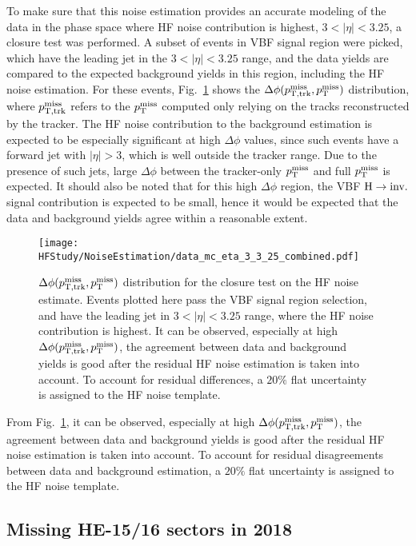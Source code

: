 To make sure that this noise estimation provides an accurate modeling of the data in the phase space where HF noise contribution is highest,
$3 < |\eta| < 3.25$, a closure test was performed. A subset of events in VBF signal region were picked, which have the leading jet in
the $3 < |\eta| < 3.25$ range, and the data yields are compared to the expected background yields in this region, including the HF noise estimation.
For these events, Fig.~\ref{fig:hf_noise_closure} shows the $\Delta\phi(p_{\mathrm{T, trk}}^{\mathrm{miss}}, p_{\textrm{T}}^{\textrm{miss}})$ distribution, where $p_{\mathrm{T, trk}}^{\mathrm{miss}}$ refers to the
$p_{\textrm{T}}^{\textrm{miss}}$ computed only relying on the tracks reconstructed by the tracker. The HF noise contribution to the background estimation is expected to be 
especially significant at high $\Delta\phi$ values,
since such events have a forward jet with $|\eta|>3$, which is well outside the tracker range. Due to the presence of such jets, 
large $\Delta\phi$ between the tracker-only $p_{\textrm{T}}^{\textrm{miss}}$
and full $p_{\textrm{T}}^{\textrm{miss}}$ is expected. It should also be noted that for this high $\Delta\phi$ region, the VBF $\textrm{H} \rightarrow \textrm{inv.}$ signal contribution is expected to be small,
hence it would be expected that the data and background yields agree within a reasonable extent.

\begin{figure}[h!]
    \centering
    \texttt{[image: HFStudy/NoiseEstimation/data\_mc\_eta\_3\_3\_25\_combined.pdf]}
    \caption{$\Delta\phi(p_{\mathrm{T, trk}}^{\mathrm{miss}}, p_{\textrm{T}}^{\textrm{miss}})$ distribution for the closure test on the HF noise estimate. Events plotted here pass the VBF signal 
    region selection, and have the leading jet in $3 < |\eta| < 3.25$ range, where the HF noise contribution is highest.
    It can be observed, especially at high $\Delta\phi(p_{\mathrm{T, trk}}^{\mathrm{miss}}, p_{\textrm{T}}^{\textrm{miss}})$, the agreement between data and background yields is good
    after the residual HF noise estimation is taken into account. To account for residual differences, a $20\%$ flat uncertainty is assigned to the HF noise template.}
    \label{fig:hf_noise_closure}
\end{figure}

From Fig.~\ref{fig:hf_noise_closure}, it can be observed, especially at high $\Delta\phi(p_{\mathrm{T, trk}}^{\mathrm{miss}}, p_{\textrm{T}}^{\textrm{miss}})$, the agreement between data and background yields is good
after the residual HF noise estimation is taken into account. To account for residual disagreements between data and background estimation, a $20\%$ flat uncertainty
is assigned to the HF noise template. 

\subsection{Missing HE-15/16 sectors in 2018}
\label{subsec:hem}

